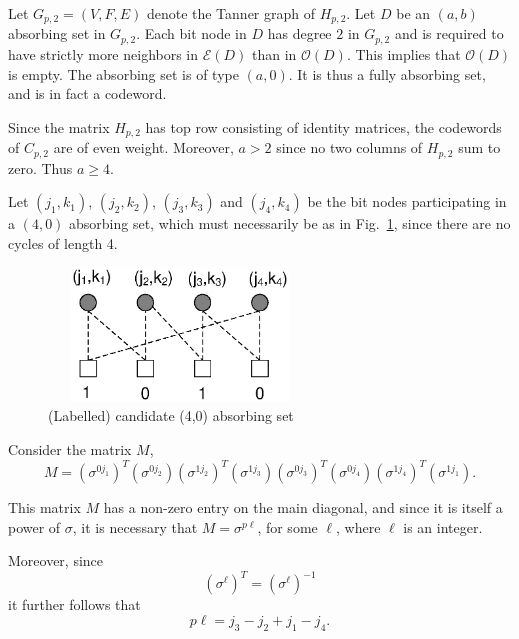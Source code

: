 Let $G_{p,2}=(V,F,E)$ denote the Tanner graph of $H_{p,2}$. Let
$D$ be an $(a,b)$ absorbing set in $G_{p,2}$. Each bit node in $D$
has degree $2$ in $G_{p,2}$ and is required to have strictly more
neighbors in $\mathcal{E}(D)$ than in $\mathcal{O}(D)$. This
implies that $\mathcal{O}(D)$ is empty. The absorbing set is of
type $(a,0)$. It is thus a fully absorbing set, and is in fact a
codeword.

Since the matrix $H_{p,2}$ has top row consisting of identity
matrices, the codewords of $C_{p,2}$ are of even weight. Moreover,
$a>2$ since no two columns of $H_{p,2}$ sum to zero. Thus $a \geq
4$.

Let $(j_1,k_1)$, $(j_2,k_2)$, $(j_3,k_3)$ and $(j_4,k_4)$ be the
bit nodes participating in a $(4,0)$ absorbing set, which must
necessarily be as in Fig.~\ref{Fig03}, since there are no cycles
of length 4.
\begin{figure}
\center\includegraphics[width=2.75in,height=1.4in]{fig03.eps}
\caption{(Labelled) candidate (4,0) absorbing set}\label{Fig03}
\end{figure}
Consider the matrix $M$,
\begin{equation}
M=(\sigma^{0j_1})^T(\sigma^{0j_2})(\sigma^{1j_2})^T(\sigma^{1j_3})(\sigma^{0j_3})^T(\sigma^{0j_4})(\sigma^{1j_4})^T(\sigma^{1j_1}).
\end{equation}

\noindent This matrix $M$ has a non-zero entry on the main
diagonal, and since it is itself a power of $\sigma$, it is
necessary that $M=\sigma^{p\ell}$, for some $\ell$, where $\ell$
is an integer.

Moreover, since
\begin{equation}\label{eq1}
(\sigma^{\ell})^T=(\sigma^{\ell})^{-1} \end{equation} it further
follows that
\begin{equation}\label{eq1}
p\ell=j_3-j_2+j_1-j_4.
\end{equation}

